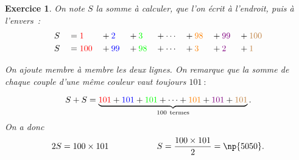 \documentclass[10pt]{article}
\newtheorem{exo}{Exercice}
\begin{document}
\begin{exo}

On note $S$ la somme à calculer, que l'on écrit à l'endroit, puis à l'envers~:
\begin{alignat*}{8}
&S&&= \textcolor{red}{1}&&+\textcolor{blue}{2}&&+\textcolor{green}{3}&&+\cdots  &&+\textcolor{orange}{98} &&+ \textcolor{violet}{99}&&+ \textcolor{brown}{100}\\
&S&&= \textcolor{red}{100}&&+\textcolor{blue}{99}&&+\textcolor{green}{98}&&+\cdots &&+\textcolor{orange}{3} &&+ \textcolor{violet}{2}&&+ \textcolor{brown}{1}
\end{alignat*}


On ajoute membre à membre les deux lignes. On remarque que la somme de chaque couple d'une même couleur vaut toujours $101~:$


\[S+S=\underbrace{\textcolor{red}{101}+\textcolor{blue}{101}+\textcolor{green}{101}+\cdots+\textcolor{orange}{101}+\textcolor{violet}{101}+\textcolor{brown}{101}}_{100~\text{termes}}.\]
On a donc
\[2S=100\times 101\hspace{2cm} S=\frac{100\times 101}{2}=\np{5050}.\]
\end{exo}
\end{document}
